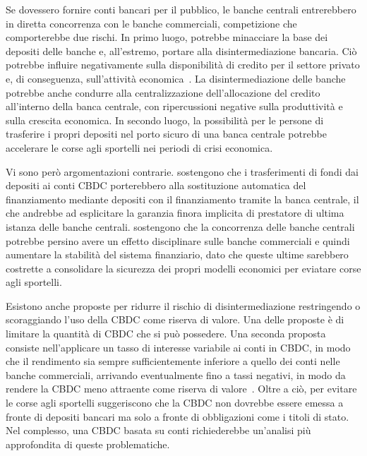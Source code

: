 \documentclass[a4paper]{article}
\begin{document}
Se dovessero fornire conti bancari per il pubblico, le banche centrali
entrerebbero in diretta concorrenza con le banche commerciali, competizione
che comporterebbe due rischi. In primo luogo, potrebbe minacciare la base
dei depositi delle banche e, all'estremo, portare alla disintermediazione
bancaria. Ciò potrebbe influire negativamente sulla disponibilità di
credito per il settore privato e, di conseguenza, sull'attività
economica~\cite[][]{Agur}. La disintermediazione delle banche potrebbe anche
condurre alla centralizzazione dell'allocazione del credito all'interno
della banca centrale, con ripercussioni negative sulla produttività e
sulla crescita economica. In secondo luogo, la possibilità per le persone
di trasferire i propri depositi nel porto sicuro di una banca centrale
potrebbe accelerare le corse agli sportelli nei periodi di crisi economica.

Vi sono però argomentazioni contrarie. \cite{Brunnermeier}
sostengono che i trasferimenti di fondi dai depositi ai conti
CBDC porterebbero alla sostituzione automatica del finanziamento
mediante depositi con il finanziamento tramite la banca centrale, il
che andrebbe ad esplicitare la garanzia finora implicita di prestatore
di ultima istanza delle banche centrali. \cite{Berentsen}
sostengono che la concorrenza delle banche centrali potrebbe persino
avere un effetto disciplinare sulle banche commerciali e quindi
aumentare la stabilità del sistema finanziario, dato che queste ultime
sarebbero costrette a consolidare la sicurezza dei propri modelli
economici per eviatare corse agli sportelli.


Esistono anche proposte per ridurre il rischio di disintermediazione
restringendo o scoraggiando l'uso della CBDC come riserva di valore. Una
delle proposte è di limitare la quantità di CBDC che si può possedere.
Una seconda proposta consiste nell'applicare un tasso di interesse
variabile ai conti in CBDC, in modo che il rendimento sia sempre
sufficientemente inferiore a quello dei conti nelle banche commerciali,
arrivando eventualmente fino a tassi negativi, in modo da rendere la CBDC
meno attraente come riserva di valore~\cite[][]{Kumhof,Bindseil}. Oltre a ciò,
per evitare le corse agli sportelli \citet{Kumhof} suggeriscono che la
CBDC non dovrebbe essere emessa a fronte di depositi bancari ma solo a
fronte di obbligazioni come i titoli di stato. Nel complesso, una CBDC
basata su conti richiederebbe un'analisi più approfondita di queste
problematiche.
\end{document}
